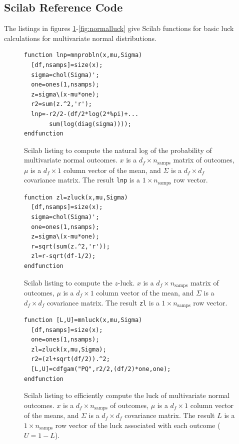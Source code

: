 \subsection{Scilab Reference Code}

The listings in figures \ref{fig:mnprobln}-\ref{fig:normalluck} give Scilab functions for basic luck calculations for multivariate normal distributions.

\begin{figure}
\caption{\label{fig:mnprobln}Scilab listing to compute the natural log of the probability of multivariate normal outcomes.  $x$ is a $d_f \times n_{\text{samps}}$ matrix of outcomes, $\mu$ is a $d_f \times 1$ column vector of the mean, and $\Sigma$ is a $d_f \times d_f$ covariance matrix.  The result {\tt lnp} is a $1 \times n_{\text{samps}}$ row vector.}
\lstset{language=Scilab}
\begin{lstlisting}
function lnp=mnprobln(x,mu,Sigma)
  [df,nsamps]=size(x);
  sigma=chol(Sigma)';
  one=ones(1,nsamps);  
  z=sigma\(x-mu*one);
  r2=sum(z.^2,'r');
  lnp=-r2/2-(df/2*log(2*%pi)+...
       sum(log(diag(sigma))));
endfunction
\end{lstlisting}
\end{figure}

\begin{figure}
\caption{\label{fig:zluck}Scilab listing to compute the $z$-luck.  $x$ is a $d_f \times n_{\text{samps}}$ matrix of outcomes, $\mu$ is a $d_f \times 1$ column vector of the mean, and $\Sigma$ is a $d_f \times d_f$ covariance matrix.  The result {\tt zl} is a $1 \times n_{\text{samps}}$ row vector.}
\lstset{language=Scilab}
\begin{lstlisting}
function zl=zluck(x,mu,Sigma)
  [df,nsamps]=size(x);
  sigma=chol(Sigma)';
  one=ones(1,nsamps);
  z=sigma\(x-mu*one);
  r=sqrt(sum(z.^2,'r'));
  zl=r-sqrt(df-1/2);
endfunction
\end{lstlisting}
\end{figure}

\begin{figure}
\caption{\label{fig:mnluck}Scilab listing to efficiently compute the luck of multivariate normal outcomes.  $x$ is a $d_f \times n_{\text{samps}}$ of outcomes, $\mu$ is a $d_f \times 1$ column vector of the means, and $\Sigma$ is a $d_f \times d_f$ covariance matrix.  The result $L$ is a $1 \times n_{\text{samps}}$ row vector of the luck associated with each outcome ($U=1-L$).}
\lstset{language=Scilab}
\begin{lstlisting}
function [L,U]=mnluck(x,mu,Sigma)
  [df,nsamps]=size(x);
  one=ones(1,nsamps);
  zl=zluck(x,mu,Sigma);
  r2=(zl+sqrt(df/2)).^2;
  [L,U]=cdfgam("PQ",r2/2,(df/2)*one,one);
endfunction
\end{lstlisting}
\end{figure}

